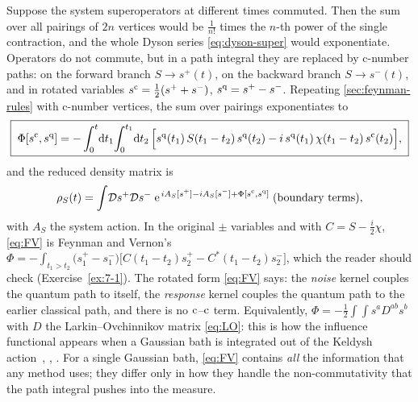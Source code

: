 Suppose the system superoperators at different times commuted.
Then the sum over all pairings of $2n$ vertices would be $\frac{1}{n!}$ times the $n$-th power of the single contraction, and the whole Dyson series \eqref{eq:dyson-super} would exponentiate.
Operators do not commute, but in a path integral they are replaced by c-number paths: on the forward branch $S\to s^+(t)$, on the backward branch $S\to s^-(t)$, and in rotated variables $s^{\mathrm{c}}=\frac12(s^++s^-)$, $s^{\mathrm{q}}=s^+-s^-$.
Repeating \cref{sec:feynman-rules} with c-number vertices, the sum over pairings exponentiates to
\begin{equation}
  \boxed{\;
  \Phi[s^{\mathrm{c}},s^{\mathrm{q}}]=-\int_0^t\!\mathrm{d} t_1\!\int_0^{t_1}\!\mathrm{d} t_2\,
  \Big[s^{\mathrm{q}}(t_1)\,S(t_1-t_2)\,s^{\mathrm{q}}(t_2)-i\,s^{\mathrm{q}}(t_1)\,\chi(t_1-t_2)\,s^{\mathrm{c}}(t_2)\Big],\;}
  \label{eq:FV}
\end{equation}
and the reduced density matrix is
\begin{equation}
  \rho_{S}(t)=\int\!\mathcal Ds^+\mathcal Ds^-\;\mathrm{e}^{\,iA_S[s^+]-iA_S[s^-]+\Phi[s^{\mathrm{c}},s^{\mathrm{q}}]}\;(\text{boundary terms}),
\end{equation}
with $A_S$ the system action.
In the original $\pm$ variables and with $C=S-\tfrac i2\chi$, \cref{eq:FV} is Feynman and Vernon's $\Phi=-\int_{t_1>t_2}\big(s^+_1-s^-_1\big)\big[C(t_1-t_2)s^+_2-C^*(t_1-t_2)s^-_2\big]$, which the reader should check (Exercise~\ref{ex:7-1}).
The rotated form \cref{eq:FV} says: the \emph{noise} kernel couples the quantum path to itself, the \emph{response} kernel couples the quantum path to the earlier classical path, and there is no $\mathrm{c}$--$\mathrm{c}$ term.
Equivalently, $\Phi=-\frac12\int\!\!\int s^aD^{ab}s^b$ with $D$ the Larkin--Ovchinnikov matrix \eqref{eq:LO}: this is how the influence functional appears when a Gaussian bath is integrated out of the Keldysh action~\cite[Sec.~3.2]{Kamenev2011}, \cite[Secs.~3--4]{Grabert1988}, \cite[Ch.~5]{Weiss2012}.
For a single Gaussian bath, \cref{eq:FV} contains \emph{all} the information that any method uses; they differ only in how they handle the non-commutativity that the path integral pushes into the measure.

